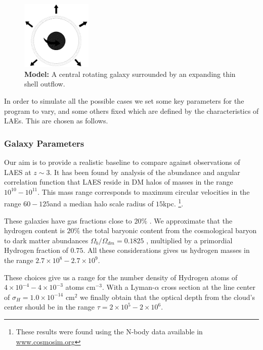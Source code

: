 \documentclass{latex/emulateapj}
\begin{document}
\begin{figure}[h!]
\begin{center}
  \includegraphics[width=0.3\textwidth]{./figures/model.png}
\end{center}
\caption{\textbf{Model:} A central rotating galaxy surrounded by an expanding thin shell outflow.
\label{fig:model}}
\end{figure}

In order to simulate all the possible cases we set some key parameters for the program to vary, and some others fixed which are defined by the characteristics of LAEs. This are chosen as follows.

\subsubsection{Galaxy Parameters}

Our aim is to provide a realistic baseline to compare against observations of LAES at $z\sim 3$. It has been found by analysis of the abundance and angular correlation function that LAES reside in DM halos of masses in the range
$10^{10}-10^{11}$\Msun \cite{WalkerSoler2012}. This mass range corresponds to maximum circular velocities in the
range $60-125$\kms and a median halo scale radius of $15$kpc.  \footnote{These results were found using the  N-body data available in \url{www.cosmosim.org}}. 


These galaxies have gas fractions close to $20\%$ \citep{Narayanan2012}. We approximate that the hydrogen content is
$20\%$ the total baryonic content from the cosmological baryon to dark matter  abundances $\Omega_b/\Omega_{dm}=0.1825$ \citep{Planck2015}, multiplied by a primordial Hydrogen fraction of $0.75$.
All these considerations gives us hydrogen masses in the range $2.7\times 10^{8}-2.7\times 10^{9}$\Msun.


These choices give us a range for the number density of Hydrogen atoms of $4\times10^{-4}-4\times 10^{-3}$ atoms cm$^{-3}$. With a Lyman-$\alpha$ cross section at the line center of $\sigma_{H}=1.0\times 10^{-14}$ cm$^{2}$ we finally obtain that the optical depth from the cloud's center  should be in the range $\tau=2 \times 10^{5} - 2 \times 10^{6}$.  
\end{document}
